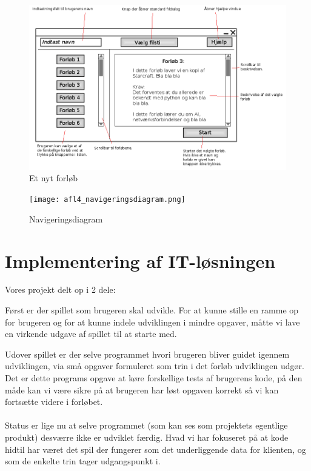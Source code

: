 \documentclass[10pt,a4paper,danish]{article}
\begin{document}
\begin{figure}[h]
  \begin{center}
    \includegraphics[scale=0.5]{nytforloeb.png}
    \caption{Et nyt forløb}
    \label{fig:nytforloeb}
  \end{center}
\end{figure}
\newpage

\begin{figure}[htb]
  \begin{center}
    \texttt{[image: afl4\_navigeringsdiagram.png]}
    \caption{Navigeringsdiagram}
    \label{fig:navigeringsdiagram}
  \end{center}
\end{figure}
\newpage

\section{Implementering af IT-løsningen}
Vores projekt delt op i 2 dele:

Først er der spillet som brugeren skal udvikle. 
For at kunne stille en ramme op for brugeren og for at kunne indele udviklingen i mindre opgaver, måtte vi lave en virkende udgave af spillet til at starte med.

Udover spillet er der selve programmet hvori brugeren bliver guidet igennem udviklingen, via små opgaver formuleret som trin i det forløb udviklingen udgør.
Det er dette programs opgave at køre forskellige tests af brugerens kode, på den måde kan vi være sikre på at brugeren har løst opgaven korrekt så vi kan fortsætte videre i forløbet.

\paragraph{}
Status er lige nu at selve programmet (som kan ses som projektets egentlige produkt) desværre ikke er udviklet færdig. Hvad vi har fokuseret på at kode hidtil har været det spil der fungerer som det underliggende data for klienten, og som de enkelte trin tager udgangspunkt i.
\end{document}
